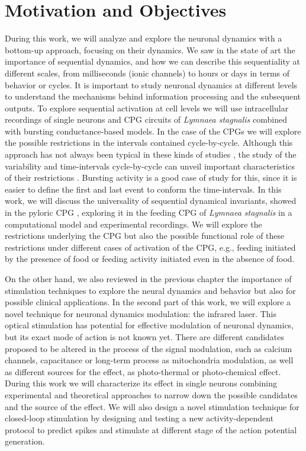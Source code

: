 \chapter{Motivation and Objectives}\label{c-review}
During this work, we will analyze and explore the neuronal dynamics with a bottom-up approach, focusing on their dynamics. We saw in the state of art the importance of sequential dynamics, and how we can describe this sequentiality at different scales, from milliseconds (ionic channels) to hours or days in terms of behavior or cycles. It is important to study neuronal dynamics at different levels to understand the mechanisms behind information processing and the subsequent outputs. To explore sequential activation at cell levels we will use intracellular recordings of single neurons and CPG circuits of \textit{Lymnaea stagnalis} combined with bursting conductance-based models. In the case of the CPGs we will explore the possible restrictions in the intervals contained cycle-by-cycle. Although this approach has not always been typical in these kinds of studies \cite{nadim_inter-animal_2022}, the study of the variability and time-intervals cycle-by-cycle can unveil important characteristics of their restrictions \parencite{elices_robust_2019}. Bursting activity is a good case of study for this, since it is easier to define the first and last event to conform the time-intervals. In this work, we will discuss the universality of sequential dynamical invariants, showed in the pyloric CPG \parencite{elices_robust_2019}, exploring it in the feeding CPG of \textit{Lymnaea stagnalis} in a computational model and experimental recordings. We will explore the restrictions underlying the CPG but also the possible functional role of these restrictions under different cases of activation of the CPG, e.g., feeding initiated by the presence of food or feeding activity initiated even in the absence of food. 

On the other hand, we also reviewed in the previous chapter the importance of stimulation techniques to explore the neural dynamics and behavior but also for possible clinical applications. In the second part of this work, we will explore a novel technique for neuronal dynamics modulation: the infrared laser. This optical stimulation has potential for effective modulation of neuronal dynamics, but its exact mode of action is not known yet. There are different candidates proposed to be altered in the process of the signal modulation, such as calcium channels, capacitance or long-term process as mitochondria modulation, as well as different sources for the effect, as photo-thermal or photo-chemical effect. During this work we will characterize its effect in single neurons combining experimental and theoretical approaches to narrow down the possible candidates and the source of the effect. We will also design a novel stimulation technique for closed-loop stimulation by designing and testing a new activity-dependent protocol to predict spikes and stimulate at different stage of the action potential generation. 

